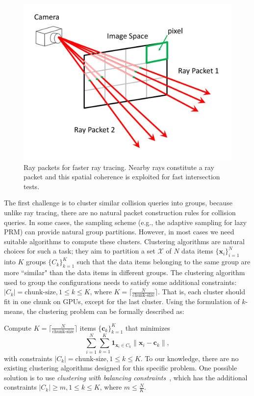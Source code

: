 \begin{figure}[htb]
  \centering
  \includegraphics[width=\linewidth]{figs/5/raypacket.pdf}
  \caption[Ray packets for faster GPU-based ray tracing]{Ray packets for faster ray tracing. Nearby rays constitute a ray packet and this spatial coherence is
  exploited for fast intersection tests.}
  \label{fig:5:raypacket}
\end{figure}

The first challenge is to cluster similar collision queries into groups, because unlike
ray tracing, there are no natural packet construction rules for collision queries. In some cases, the sampling scheme (e.g., the adaptive sampling for lazy PRM) can provide natural group partitions. However, in most cases
we need suitable algorithms to compute these clusters. Clustering algorithms are natural choices for such a task; they aim
to partition a set $\mathcal{X}$ of $N$ data items $\{\mathbf{x}_i\}_{i=1}^N$ into $K$ groups $\{C_k\}_{k=1}^K$ such that the data items belonging to the same group are more ``similar" than the data items in different groups. The clustering algorithm
used to group the configurations needs to satisfy some additional constraints: $|C_k| = \text{chunk-size}, 1\leq k \leq K$, where $K = \lceil \frac{N}{\text{chunk-size}} \rceil$. That is, each cluster should fit in one chunk on GPUs, except for the last cluster. Using the formulation of $k$-means, the clustering problem can be formally described as:

\noindent Compute $K = \lceil \frac{N}{\text{chunk-size}} \rceil$ items $\{\mathbf{c}_k\}_{k=1}^K$ that minimizes
\begin{equation}
\label{eq:5:cluster}
\sum_{i=1}^N\sum_{k=1}^K \mathbf{1}_{\mathbf{x}_i \in C_k} \|\mathbf{x}_i - \mathbf{c}_k\|,
\end{equation}
with constraints $|C_k| = \text{chunk-size}, 1\leq k \leq K$. To our knowledge, there are no existing clustering algorithms designed
for this specific problem. One possible solution is to use \emph{clustering with balancing constraints}~\cite{Banerjee:2006},
which has the additional constraints $|C_k| \geq m, 1\leq k \leq K$, where $m \leq \frac{N}{K}$.

